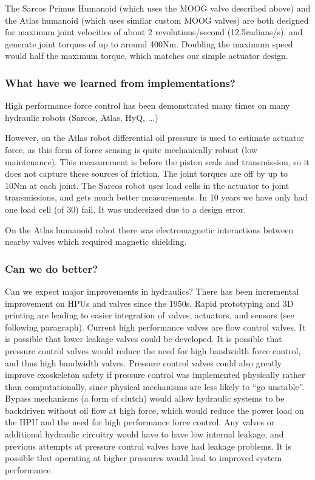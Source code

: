 \documentclass[letterpaper,12pt,fullpage]{article}
\begin{document}
The Sarcos Primus Humanoid (which uses the MOOG valve described
above) and the Atlas humanoid (which uses similar custom MOOG valves)
are both designed
for maximum joint velocities of about 2 revolutions/second (12.5radians/s).
and generate joint torques of up to around 400Nm.
Doubling the maximum speed would half the maximum torque, which matches
our simple actuator design.

\subsubsection{What have we learned from implementations?}

High performance force control has been demonstrated many times
on many hydraulic robots (Sarcos, Atlas, HyQ, ...)

However, on the Atlas robot differential oil pressure is used
to estimate actuator force, as this form of force sensing
is quite mechanically robust (low maintenance).
This measurement is before the piston
seals and transmission, so it does not capture these sources
of friction. The joint torques are off by up to 10Nm at each joint.
The Sarcos robot uses load cells in the actuator to joint transmissions,
and gets much better measurements. In 10 years we have only had
one load cell (of 30) fail. It was undersized due to a design error.

On the Atlas humanoid robot there was electromagnetic interactions between
nearby valves which required magnetic shielding.

\subsubsection{Can we do better?}

Can we expect major improvements in hydraulics?
There has been incremental improvement on HPUs and valves since
the 1950s. Rapid prototyping and 3D printing are leading to
easier integration of valves, actuators, and sensors (see following
paragraph). Current high performance valves are flow control valves. It
is possible that lower leakage valves could be developed. It is possible
that pressure control valves would reduce the need for high bandwidth
force control, and thus high bandwidth valves. Pressure control valves
could also greatly improve exoskeleton safety if pressure control was
implemented physically rather than computationally, since physical
mechanisms are less likely to ``go unstable''.
Bypass mechanisms (a form of clutch) would allow hydraulic systems
to be backdriven without oil flow at high force, which would reduce
the power load on the HPU and the need for high performance force control.
Any valves or additional hydraulic circuitry
would have to have low internal leakage, and previous attempts at
pressure control valves have had leakage problems.
It is possible that operating at higher pressures would lead to improved
system performance.
\end{document}
